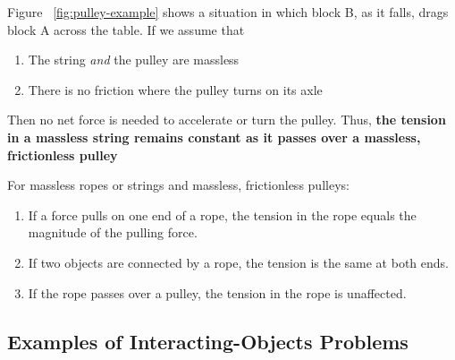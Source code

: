 Figure~%
\ref{fig:pulley-example} shows a situation in which block B, as it
falls, drags block A across the table.  If we assume that
\begin{enumerate}
    \item
        The string \emph{and} the pulley are massless
    \item
        There is no friction where the pulley turns on its axle
\end{enumerate}
Then no net force is needed to accelerate or turn the pulley.  Thus,
\textbf{the tension in a massless string remains constant as it passes
over a massless, frictionless pulley}

For massless ropes or strings and massless, frictionless pulleys:
\begin{enumerate}
    \item
        If a force pulls on one end of a rope, the tension in the rope
        equals the magnitude of the pulling force.
    \item
        If two objects are connected by a rope, the tension is the same
        at both ends.
    \item
        If the rope passes over a pulley, the tension in the rope is
        unaffected.
\end{enumerate}

\subsection{Examples of Interacting-Objects Problems}

